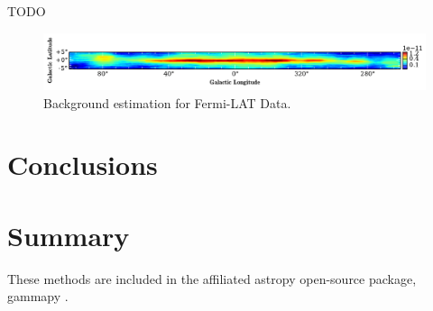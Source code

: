 \documentclass{PoS}
\begin{document}
TODO


\begin{table}
\centering
{}
\caption{Galactic plane fluxes for separated background from true Fermi-LAT data.}
\end{table}


\begin{figure}
  \begin{center}
      \includegraphics[width=\textwidth]{figures/BG_DATA.pdf}
  \caption{Background estimation for Fermi-LAT Data.}
  \end{center}
\end{figure}

\section{Conclusions}


\section{Summary}
These methods are included in the affiliated astropy open-source package, gammapy \cite{Deil}.

\begin{thebibliography}{99}





\end{thebibliography}
\end{document}
